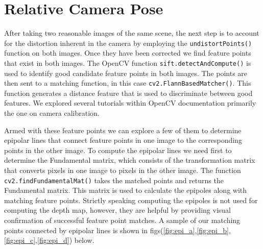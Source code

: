 \documentclass[a4paper]{article}
\begin{document}
\section{Relative Camera Pose}
After taking two reasonable images of the same scene, the next step is to account for the distortion inherent in the camera by employing the \verb|undistortPoints()| function on both images.  Once they have been corrected we find feature points that exist in both images.  The OpenCV function \verb|sift.detectAndCompute()| is used to identify good candidate feature points in both images.  The points are then sent to a matching function, in this case \verb|cv2.FlannBasedMatcher()|.  This function generates a distance feature that is used to discriminate between good features. We explored several tutorials within OpenCV documentation primarily the one on camera calibration. 

Armed with these feature points we can explore a few of them to determine epipolar lines that connect feature points in one image to the corresponding points in the other image.  To compute the epipolar lines we need first to determine the Fundamental matrix, which consists of the transformation matrix that converts pixels in one image to pixels in the other image.  The function \verb|cv2.findFundamentalMat()| takes the matched points and returns the Fundamental matrix.  This matrix is used to calculate the epipoles along with matching feature points.  Strictly speaking computing the epipoles is not used for computing the depth map, however, they are helpful by providing visual confirmation of successful feature point matches. A sample of our matching points connected by epipolar lines is shown in figs(\ref{fig:epi_a},\ref{fig:epi_b},\ref{fig:epi_c},\ref{fig:epi_d}) below.
\end{document}
